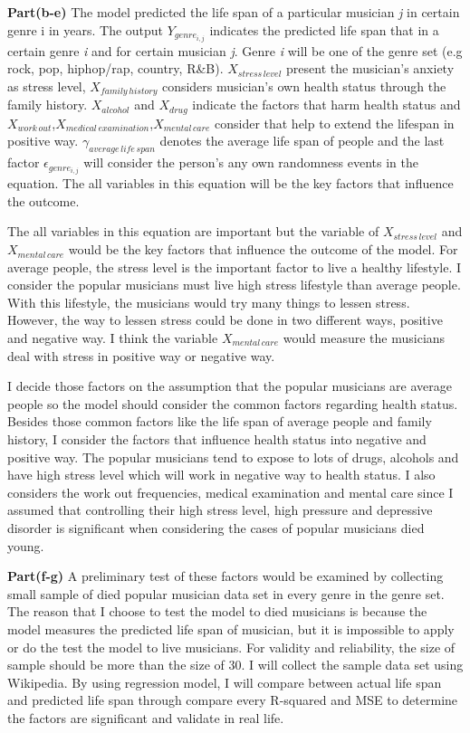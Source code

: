 \documentclass[letterpaper,12pt]{article}
\theoremstyle{definition}
\begin{document}
\textbf{Part(b-e)}
The model predicted the life span of a particular musician \textit{j} in certain genre i in years. The output $Y_{genre_{i,j}}$ indicates the predicted life span that in a certain genre \textit{i} and for certain musician \textit{j}. Genre \textit{i} will be one of  the genre set (e.g rock, pop, hiphop/rap, country, R\&B). $X_{stress\, level}$ present the musician{'}s anxiety as stress level, $X_{family\, history}$ considers musician{'}s own health status through the family history. $X_{alcohol}$ and $X_{drug}$ indicate the factors that harm health status and $X_{work\, out}$,$X_{medical\, examination}$,$X_{mental\, care}$ consider that help to extend the lifespan in positive way. $\gamma _{average\, life\, span }$ denotes the average life span of people and the last factor $\epsilon_{genre_{i,j}}$ will consider the person{'}s any own randomness events in the equation. The all variables in this equation will be the key factors that influence the outcome. 
\par 
The all variables in this equation are important but the variable of $X_{stress\, level}$ and $X_{mental\, care}$ would be the key factors that influence the outcome of the model. For average people, the stress level is the important factor to live a healthy lifestyle. I consider the popular musicians must live high stress lifestyle than average people. With this lifestyle, the musicians would try many things to lessen stress. However, the way to lessen stress could be done in two different ways, positive and negative way. I think the variable $X_{mental\, care}$ would measure the musicians deal with stress in positive way or negative way. 

\par
I decide those factors on the assumption that the popular musicians are average people so the model should consider the common factors regarding health status. Besides those common factors like the life span of average people and family history, I consider the factors that influence health status into negative and positive way. The popular musicians tend to expose to lots of drugs, alcohols and have high stress level which will work in negative way to health status. I also considers the work out frequencies, medical examination and mental care since I assumed that controlling their high stress level, high pressure and depressive disorder is significant when considering the cases of popular musicians died young.\\
\par\textbf{Part(f-g)}
A preliminary test of these factors would be examined by collecting small sample of died popular musician data set in every genre in the genre set. The reason that I choose to test the model to died musicians is because the model measures the predicted life span of musician, but it is impossible to apply or do the test the model to live musicians. For validity and reliability, the size of sample should be more than the size of 30. I will collect the sample data set using Wikipedia. By using regression model, I will compare between actual life span and predicted life span through compare every R-squared and MSE to determine the factors are significant and validate in real life. 
\end{document}
